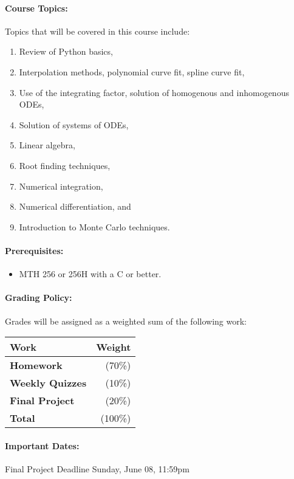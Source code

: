 \documentclass[11pt, a4paper]{article}
\begin{document}
\paragraph{Course Topics:}
\noindent Topics that will be covered in this course include:
\begin{enumerate}
\item Review of Python basics,
\item Interpolation methods, polynomial curve fit, spline curve fit,
\item Use of the integrating factor, solution of homogenous and inhomogenous ODEs, 
\item Solution of systems of ODEs,
\item Linear algebra,
\item Root finding techniques,
\item Numerical integration,
\item Numerical differentiation, and
\item Introduction to Monte Carlo techniques. 
\end{enumerate}

\paragraph{Prerequisites:}
\begin{itemize}
\item MTH 256 or 256H with a C or better. 
\end{itemize}

\paragraph{Grading Policy:} Grades will be assigned as a weighted sum of the following work:

\begin{table}[h]
\begin{tabularx}{\textwidth}{Xr}
\textbf{Work} & \textbf{Weight}\\
\hline
\textbf{Homework} & (70\%) \\
\textbf{Weekly Quizzes} & (10\%) \\
\textbf{Final Project} & (20\%) \\
\hline
\textbf{Total} & (100\%) \\
\end{tabularx}
\end{table}

\paragraph{Important Dates:}
\begin{center} \begin{minipage}{3.8in}
\begin{flushleft}
Final Project Deadline      \dotfill Sunday, June 08, 11:59pm  \\
\end{flushleft}
\end{minipage}
\end{center}
\end{document}
